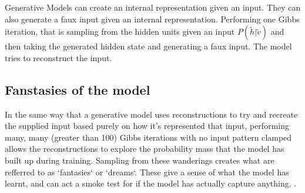 Generative Models can create an internal representation given an input. They can also generate a faux input given an internal representation. Performing one Gibbs iteration, that is sampling from the hidden units given an input $ P(\tilde{h}|\tilde{v}) $ and then taking the generated hidden state and generating a faux input. The model tries to reconstruct the input.

\subsection{Fanstasies of the model}

In the same way that a generative model uses reconstructions to try and recreate the  supplied input based purely on how it's represented that input, performing many, many (greater than 100) Gibbs iterations with no input pattern clamped allows the reconstructions to explore the probability mass that the model has built up during training. Sampling from these wanderings creates what are refferred to as `fantasies` or `dreams`. These give a sense of what the model has learnt, and can act a smoke test for if the model has actually capture anything.
.

%
%
%

%

